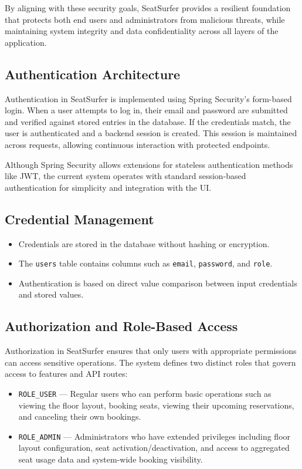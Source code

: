 \documentclass[12pt,a4paper]{report} %
\begin{document}
By aligning with these security goals, SeatSurfer provides a resilient foundation that protects both end users and administrators from malicious threats, while maintaining system integrity and data confidentiality across all layers of the application.

\subsection{Authentication Architecture}

Authentication in SeatSurfer is implemented using Spring Security's form-based login. When a user attempts to log in, their email and password are submitted and verified against stored entries in the database. If the credentials match, the user is authenticated and a backend session is created. This session is maintained across requests, allowing continuous interaction with protected endpoints.

Although Spring Security allows extensions for stateless authentication methods like JWT, the current system operates with standard session-based authentication for simplicity and integration with the UI.

\subsection*{Credential Management}

\begin{itemize}
    \item Credentials are stored in the database without hashing or encryption.
    \item The \verb|users| table contains columns such as \verb|email|, \verb|password|, and \verb|role|.
    \item Authentication is based on direct value comparison between input credentials and stored values.
\end{itemize}

\subsection{Authorization and Role-Based Access}

Authorization in SeatSurfer ensures that only users with appropriate permissions can access sensitive operations. The system defines two distinct roles that govern access to features and API routes:

\begin{itemize}
    \item \verb|ROLE_USER| — Regular users who can perform basic operations such as viewing the floor layout, booking seats, viewing their upcoming reservations, and canceling their own bookings.
    \item \verb|ROLE_ADMIN| — Administrators who have extended privileges including floor layout configuration, seat activation/deactivation, and access to aggregated seat usage data and system-wide booking visibility.
\end{itemize}
\end{document}
